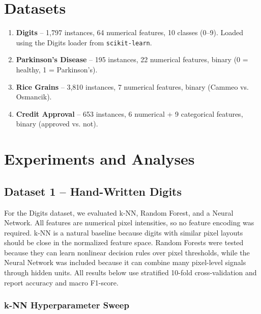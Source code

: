 \documentclass[11pt]{article}
\begin{document}
\section{Datasets}

\begin{enumerate}
  \item \textbf{Digits} -- 1,797 instances, 64 numerical features, 10 classes (0--9).
        Loaded using the Digits loader from \texttt{scikit-learn}.
  \item \textbf{Parkinson's Disease} -- 195 instances, 22 numerical features, binary
        (0 = healthy, 1 = Parkinson's).
  \item \textbf{Rice Grains} -- 3,810 instances, 7 numerical features, binary
        (Cammeo vs. Osmancik).
  \item \textbf{Credit Approval} -- 653 instances, 6 numerical + 9 categorical features,
        binary (approved vs. not).
\end{enumerate}

\section{Experiments and Analyses}

\subsection{Dataset 1 -- Hand-Written Digits}

For the Digits dataset, we evaluated k-NN, Random Forest, and a Neural Network.
All features are numerical pixel intensities, so no feature encoding was required.
k-NN is a natural baseline because digits with similar pixel layouts should be close in
the normalized feature space. Random Forests were tested because they can learn nonlinear
decision rules over pixel thresholds, while the Neural Network was included because it can
combine many pixel-level signals through hidden units. All results below use stratified
10-fold cross-validation and report accuracy and macro F1-score.

\subsubsection*{k-NN Hyperparameter Sweep}
\end{document}
